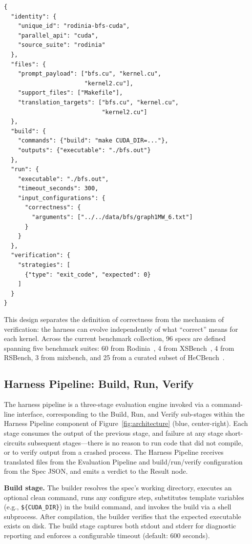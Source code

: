 \documentclass[conference]{IEEEtran}
\begin{document}
\begin{lstlisting}[language={},caption={Condensed spec for \texttt{rodinia-bfs-cuda}.}]
{
  "identity": {
    "unique_id": "rodinia-bfs-cuda",
    "parallel_api": "cuda",
    "source_suite": "rodinia"
  },
  "files": {
    "prompt_payload": ["bfs.cu", "kernel.cu",
                       "kernel2.cu"],
    "support_files": ["Makefile"],
    "translation_targets": ["bfs.cu", "kernel.cu",
                            "kernel2.cu"]
  },
  "build": {
    "commands": {"build": "make CUDA_DIR=..."},
    "outputs": {"executable": "./bfs.out"}
  },
  "run": {
    "executable": "./bfs.out",
    "timeout_seconds": 300,
    "input_configurations": {
      "correctness": {
        "arguments": ["../../data/bfs/graph1MW_6.txt"]
      }
    }
  },
  "verification": {
    "strategies": [
      {"type": "exit_code", "expected": 0}
    ]
  }
}
\end{lstlisting}

This design separates the definition of correctness from the mechanism of verification: the harness can evolve independently of what ``correct'' means for each kernel. Across the current benchmark collection, 96 specs are defined spanning five benchmark suites: 60 from Rodinia~\cite{Rodinia2009}, 4 from XSBench~\cite{XSBench2014}, 4 from RSBench, 3 from mixbench, and 25 from a curated subset of HeCBench~\cite{HeCBench2023}.

\subsection{Harness Pipeline: Build, Run, Verify}
\label{sec:harness}

The harness pipeline is a three-stage evaluation engine invoked via a command-line interface, corresponding to the Build, Run, and Verify sub-stages within the Harness Pipeline component of Figure~\ref{fig:architecture} (blue, center-right). Each stage consumes the output of the previous stage, and failure at any stage short-circuits subsequent stages---there is no reason to run code that did not compile, or to verify output from a crashed process. The Harness Pipeline receives translated files from the Evaluation Pipeline and build/run/verify configuration from the Spec JSON, and emits a verdict to the Result node.

\textbf{Build stage.} The builder resolves the spec's working directory, executes an optional clean command, runs any configure step, substitutes template variables (e.g., \texttt{\$\{CUDA\_DIR\}}) in the build command, and invokes the build via a shell subprocess. After compilation, the builder verifies that the expected executable exists on disk. The build stage captures both stdout and stderr for diagnostic reporting and enforces a configurable timeout (default: 600 seconds).
\end{document}
